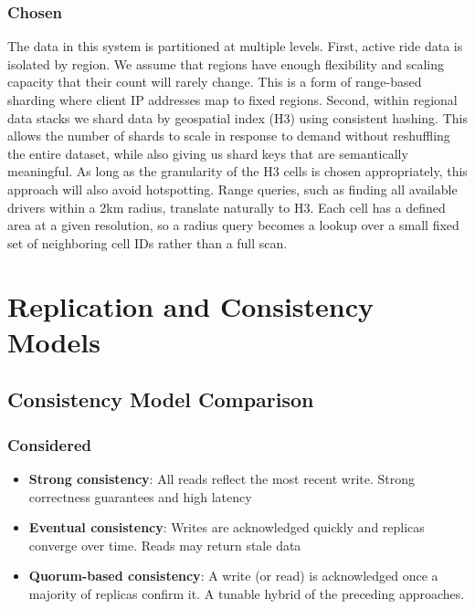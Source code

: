 \documentclass[12pt]{article}
\begin{document}
\subsubsection{Chosen}

The data in this system is partitioned at multiple levels. First, active ride data is isolated by region. We assume that regions have enough flexibility and scaling capacity that their count will rarely change. This is a form of range-based sharding where client IP addresses map to fixed regions. Second, within regional data stacks we shard data by geospatial index (H3\cite{h3}) using consistent hashing. This allows the number of shards to scale in response to demand without reshuffling the entire dataset, while also giving us shard keys that are semantically meaningful. As long as the granularity of the H3 cells is chosen appropriately, this approach will also avoid hotspotting. Range queries, such as finding all available drivers within a 2km radius, translate naturally to H3. Each cell has a defined area at a given resolution, so a radius query becomes a lookup over a small fixed set of neighboring cell IDs rather than a full scan.

\section{Replication and Consistency Models}
\label{sec:replication-consistency}

\subsection{Consistency Model Comparison}

\subsubsection{Considered}
\begin{itemize}
    \item \textbf{Strong consistency}: All reads reflect the most recent write. Strong correctness guarantees and high latency
    \item \textbf{Eventual consistency}: Writes are acknowledged quickly and replicas converge over time. Reads may return stale data
    \item \textbf{Quorum-based consistency}: A write (or read) is acknowledged once a majority of replicas confirm it. A tunable hybrid of the preceding approaches.
\end{itemize}
\end{document}
